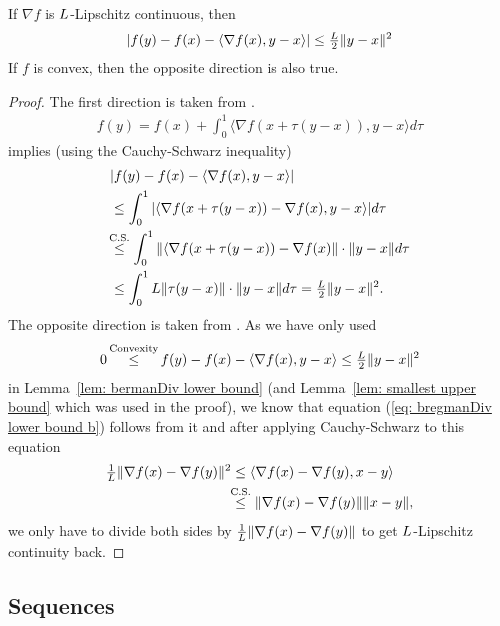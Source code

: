 \begin{lemma}
	\label{Appdx-lem: Lipschitz Gradient implies taylor inequality}
	If \(\nabla f\) is \(L\)-Lipschitz continuous, then
	\begin{align*}
		|f(y) - f(x) - \langle \nabla f(x), y-x\rangle | \le \tfrac{L}2 \|y-x\|^2
	\end{align*}
	If \(f\) is convex, then the opposite direction is also true.
\end{lemma}
\begin{proof}
	The first direction is taken from \textcite[Lemma
	1.2.3]{nesterovLecturesConvexOptimization2018}.
 \begin{align*}
		f(y) = f(x) + \int_0^1\langle\nabla f(x+\tau(y-x)), y-x \rangle d\tau
	\end{align*}
	implies (using the  Cauchy-Schwarz inequality)
	\begin{align*}
		&| f(y) - f(x) - \langle \nabla f(x), y-x\rangle | \\
		&\le \int_0^1 | \langle\nabla f(x+\tau(y-x))-\nabla f(x), y-x\rangle | d\tau \\
		&\lxle{\text{C.S.}}
		\int_0^1 \|\langle\nabla f(x+\tau(y-x))-\nabla f(x)\| \cdot \|y-x\| d\tau\\
		&\le \int_0^1 \ubound \|\tau(y-x)\|\cdot\|y-x\| d\tau
		= \tfrac{\ubound}2 \|y-x\|^2.
	\end{align*}
	The opposite direction is taken from \textcite[Lemma
	2.1.5]{nesterovLecturesConvexOptimization2018}.
	As we have only used
	\begin{align*}
		0\xle{\text{Convexity}} f(y) - f(x) - \langle \nabla f(x), y-x\rangle
		\le \tfrac{\ubound}2 \|y-x\|^2
	\end{align*}	
	in Lemma~\ref{lem: bermanDiv lower bound} (and Lemma~\ref{lem: smallest upper
	bound} which was used in the proof), we know that equation (\ref{eq:
	bregmanDiv lower bound b}) follows from it and after applying Cauchy-Schwarz
	to this equation
	\begin{align*}
		\tfrac{1}\ubound \|\nabla f(x)-\nabla f(y)\|^2
		&\le \langle \nabla f(x) - \nabla f(y), x-y\rangle \\
		&\lxle{\text{C.S.}} \|\nabla f(x) - \nabla f(y)\| \|x-y\|,
	\end{align*}
	we only have to divide both sides by \(\tfrac{1}{L} \|\nabla f(x)-\nabla
	f(y)\|\) to get \(L\)-Lipschitz continuity back.
\end{proof}

\subsection{Sequences}


